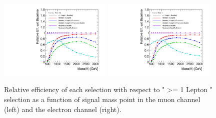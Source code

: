  
\begin{figure}[!htbp]
\begin{center}
\includegraphics*[width=0.48\textwidth]{./figures/boosted/BoostedVsResolved_truthmuon_recomuon_releff}
\includegraphics*[width=0.48\textwidth]{./figures/boosted/BoostedVsResolved_truthelec_recoelec_releff}
\caption{Relative efficiency of each selection with respect to " >= 1 Lepton " selection as a function of signal 
mass point in the muon channel (left) and the electron channel (right).
}
\label{fig:boosted_boostedvsresolved_hbb}
\end{center}
\end{figure}

\FloatBarrier